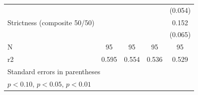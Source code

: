 \begin{table}[htbp]
{\begin{tabular}{l*{4}{c}}
                    &                     &                     &                     &     (0.054)         \\
\addlinespace
Strictness (composite 50/50)&                     &                     &                     &       0.152\sym{**} \\
                    &                     &                     &                     &     (0.065)         \\
\midrule
N                   &          95         &          95         &          95         &          95         \\
r2                  &       0.595         &       0.554         &       0.536         &       0.529         \\
\bottomrule
\multicolumn{5}{l}{\footnotesize Standard errors in parentheses}\\
\multicolumn{5}{l}{\footnotesize \sym{*} \(p<0.10\), \sym{**} \(p<0.05\), \sym{***} \(p<0.01\)}\\
\end{tabular}%
}
\end{table}
